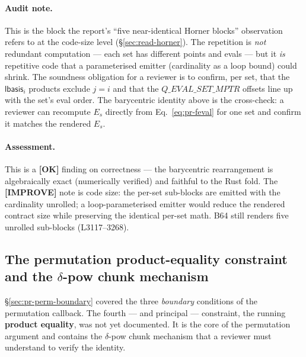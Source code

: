 \paragraph{Audit note.} This is the block the report's
``five near-identical Horner blocks'' observation refers to at
the code-size level (§\ref{sec:read-horner}). The repetition is \emph{not}
redundant computation --- each set has different points and evals
--- but it \emph{is} repetitive code that a parameterised emitter
(cardinality as a loop bound) could shrink. The soundness
obligation for a reviewer is to confirm, per set, that the
$\mathsf{lbasis}_i$ products exclude $j=i$ and that the
$Q\_EVAL\_SET\_MPTR$ offsets line up with the set's eval order.
The barycentric identity above is the cross-check: a reviewer can
recompute $E_s$ directly from Eq.~\eqref{eq:pr-feval} for one set
and confirm it matches the rendered $E_s$.

\paragraph{Assessment.} This is a
\textcolor{tracegreen}{\textbf{[OK]}} finding on correctness ---
the barycentric rearrangement is algebraically exact (numerically
verified) and faithful to the Rust fold. The
\textcolor{codegenblue}{\textbf{[IMPROVE]}} note is code size:
the per-set sub-blocks are emitted with the cardinality unrolled;
a loop-parameterised emitter would reduce the rendered contract
size while preserving the identical per-set math. 
B64 still renders five unrolled sub-blocks (L3117--3268).

\subsection{The permutation product-equality constraint and the \texorpdfstring{$\delta$}{delta}-pow chunk mechanism}
\label{sec:pr-perm-product}

§\ref{sec:pr-perm-boundary} covered the three \emph{boundary}
conditions of the permutation callback. The fourth --- and
principal --- constraint, the running \textbf{product equality},
was not yet documented. It is the core of the permutation
argument and contains the \(\delta\)-pow chunk mechanism that a
reviewer must understand to verify the identity.

